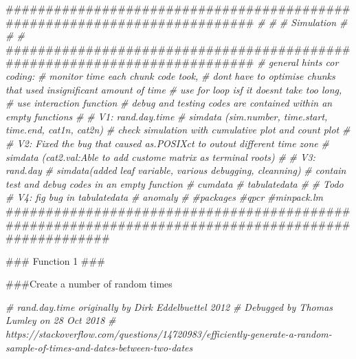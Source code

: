 \documentclass[]{article}
\newenvironment{Shaded}{\begin{snugshade}}{\end{snugshade}}
\newcommand{\CommentTok}[1]{\textcolor[rgb]{0.56,0.35,0.01}{\textit{{#1}}}}
\newcommand{\NormalTok}[1]{{#1}}
\begin{document}
\begin{Shaded}
\begin{Highlighting}[]
\NormalTok{##########################################################################}
\CommentTok{#                                                                        #}
\CommentTok{# Simulation                                                             #}
\CommentTok{#                                                                        #}
\NormalTok{##########################################################################}
\CommentTok{# general hints cor coding:}
\CommentTok{# monitor time each chunk code took, }
\CommentTok{# dont have to optimise chunks that used insignificant amount of time }
\CommentTok{# use for loop isf it doesnt take too long, }
\CommentTok{# use interaction function}
\CommentTok{# debug and testing codes are contained within an empty  functions}
\CommentTok{#}
\CommentTok{# V1: rand.day.time}
\CommentTok{#     simdata (sim.number, time.start, time.end, cat1n, cat2n)}
\CommentTok{#     check simulation with cumulative plot and count plot}
\CommentTok{#}
\CommentTok{# V2: Fixed the bug that caused as.POSIXct to outout different time zone}
\CommentTok{#     simdata (cat2.val:Able to add custome matrix as terminal roots)}
\CommentTok{#}
\CommentTok{# V3: rand.day}
\CommentTok{#     simdata(added leaf variable, various debugging, cleanning)}
\CommentTok{#     contain test and debug codes in an empty function}
\CommentTok{#     cumdata}
\CommentTok{#     tabulatedata }
\CommentTok{#}
\CommentTok{# Todo}
\CommentTok{# V4: fig bug in tabulatedata }
\CommentTok{#     anomaly}
\CommentTok{#     }
\CommentTok{#packages}
\CommentTok{#qpcr}
\CommentTok{#minpack.lm}
\NormalTok{###################################################################################################}

\NormalTok{### Function 1 ###}

\NormalTok{###Create a number of random times}

\CommentTok{# rand.day.time originally by Dirk Eddelbuettel 2012}
\CommentTok{# Debugged by Thomas Lumley on 28 Oct 2018}
\CommentTok{# https://stackoverflow.com/questions/14720983/efficiently-generate-a-random-sample-of-times-and-dates-between-two-dates}


\end{Highlighting}
\end{Shaded}
\end{document}
